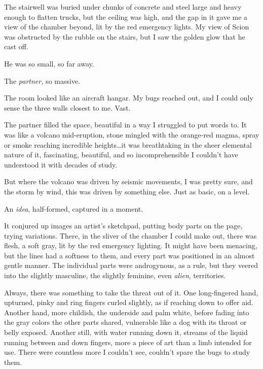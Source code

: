 





The stairwell was buried under chunks of concrete and steel large and heavy enough to flatten trucks, but the ceiling was high, and the gap in it gave me a view of the chamber beyond, lit by the red emergency lights.  My view of Scion was obstructed by the rubble on the stairs, but I saw the golden glow that he cast off.



He was so small, so far away.



The \emph{partner, }so massive.



The room looked like an aircraft hangar.  My bugs reached out, and I could only sense the three walls closest to me.  Vast.



The partner filled the space, beautiful in a way I struggled to put words to.  It was like a volcano mid-eruption, stone mingled with the orange-red magma, spray or smoke reaching incredible heights\ldots it was breathtaking in the sheer elemental nature of it, fascinating, beautiful, and so incomprehensible I couldn't have understood it with decades of study.



But where the volcano was driven by seismic movements, I was pretty sure, and the storm by wind, this was driven by something else.  Just as basic, on a level.



An \emph{idea}, half-formed, captured in a moment.



It conjured up images an artist's sketchpad, putting body parts on the page, trying variations.  There, in the sliver of the chamber I could make out, there was flesh, a soft gray, lit by the red emergency lighting.  It might have been menacing, but the lines had a softness to them, and every part was positioned in an almost gentle manner.  The individual parts were androgynous, as a rule, but they veered into the slightly masculine, the slightly feminine, even \emph{alien}, territories.



Always, there was something to take the threat out of it.  One long-fingered hand, upturned, pinky and ring fingers curled slightly, as if reaching down to offer aid.  Another hand, more childish, the underside and palm white, before fading into the gray colors the other parts shared, vulnerable like a dog with its throat or belly exposed.  Another still, with water running down it, streams of the liquid running between and down fingers, more a piece of art than a limb intended for use.  There were countless more I couldn't see, couldn't spare the bugs to study them.



